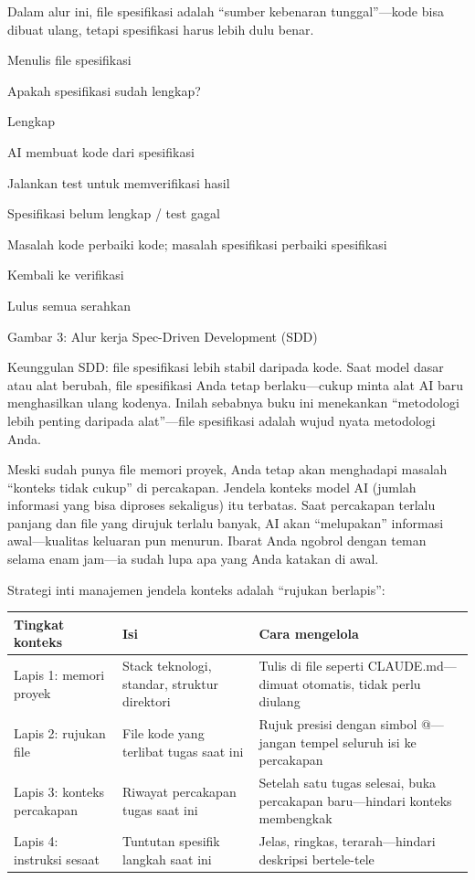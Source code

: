Dalam alur ini, file spesifikasi adalah “sumber kebenaran tunggal”—kode bisa dibuat ulang, tetapi spesifikasi harus lebih dulu benar.

Menulis file spesifikasi

Apakah spesifikasi sudah lengkap?

Lengkap

AI membuat kode dari spesifikasi

Jalankan test untuk memverifikasi hasil

Spesifikasi belum lengkap / test gagal

Masalah kode perbaiki kode; masalah spesifikasi perbaiki spesifikasi

Kembali ke verifikasi

Lulus semua serahkan

\begin{center}\small\color{gray}Gambar 3: Alur kerja Spec-Driven Development (SDD)\end{center}

Keunggulan SDD: file spesifikasi lebih stabil daripada kode. Saat model dasar atau alat berubah, file spesifikasi Anda tetap berlaku—cukup minta alat AI baru menghasilkan ulang kodenya. Inilah sebabnya buku ini menekankan “metodologi lebih penting daripada alat”—file spesifikasi adalah wujud nyata metodologi Anda.


Meski sudah punya file memori proyek, Anda tetap akan menghadapi masalah “konteks tidak cukup” di percakapan. Jendela konteks model AI (jumlah informasi yang bisa diproses sekaligus) itu terbatas. Saat percakapan terlalu panjang dan file yang dirujuk terlalu banyak, AI akan “melupakan” informasi awal—kualitas keluaran pun menurun. Ibarat Anda ngobrol dengan teman selama enam jam—ia sudah lupa apa yang Anda katakan di awal.

Strategi inti manajemen jendela konteks adalah “rujukan berlapis”:

\begin{center}
\begin{tabularx}{\linewidth}{|X|X|X|}
\hline
\textbf{Tingkat konteks} & \textbf{Isi} & \textbf{Cara mengelola} \tabularnewline
\hline
Lapis 1: memori proyek & Stack teknologi, standar, struktur direktori & Tulis di file seperti CLAUDE.md—dimuat otomatis, tidak perlu diulang \tabularnewline
Lapis 2: rujukan file & File kode yang terlibat tugas saat ini & Rujuk presisi dengan simbol @—jangan tempel seluruh isi ke percakapan \tabularnewline
Lapis 3: konteks percakapan & Riwayat percakapan tugas saat ini & Setelah satu tugas selesai, buka percakapan baru—hindari konteks membengkak \tabularnewline
Lapis 4: instruksi sesaat & Tuntutan spesifik langkah saat ini & Jelas, ringkas, terarah—hindari deskripsi bertele-tele \tabularnewline
\hline
\end{tabularx}
\end{center}

